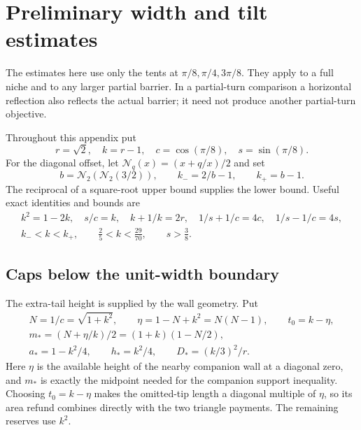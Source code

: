 \section{Preliminary width and tilt estimates}\label{app:preliminary-estimates}

The estimates here use only the tents at $\pi/8,\pi/4,3\pi/8$.
They apply to a full niche and to any larger partial barrier. In a
partial-turn comparison a horizontal reflection also reflects the
actual barrier; it need not produce another partial-turn objective.

Throughout this appendix put
\[
 r=\sqrt2,\quad k=r-1,\quad c=\cos(\pi/8),\quad s=\sin(\pi/8).
\]
For the diagonal offset, let $\mathcal N_q(x)=(x+q/x)/2$ and set
\[
 b=\mathcal N_2(\mathcal N_2(3/2)),\qquad k_-=2/b-1,\qquad k_+=b-1.
\]
The reciprocal of a square-root upper bound supplies the lower bound.
Useful exact identities and bounds are
\begin{equation}\label{eq:preliminary-constants}
 \begin{gathered}
 k^2=1-2k,\quad s/c=k,\quad k+1/k=2r,\quad
 1/s+1/c=4c,\quad 1/s-1/c=4s,\\
 k_-<k<k_+,\qquad \frac25<k<\frac{29}{70},\qquad s>\frac38.
 \end{gathered}
\end{equation}

\subsection{Caps below the unit-width boundary}

The extra-tail height is supplied by the wall geometry. Put
\[
 \begin{gathered}
 N=1/c=\sqrt{1+k^2},\qquad \eta=1-N+k^2=N(N-1),\qquad t_0=k-\eta,\\
 m_*=(N+\eta/k)/2=(1+k)(1-N/2),\\
 a_*=1-k^2/4,\qquad h_*=k^2/4,\qquad D_*=(k/3)^2/r.
 \end{gathered}
\]
Here $\eta$ is the available height of the nearby companion wall at
a diagonal zero, and $m_*$ is exactly the midpoint needed for the
companion support inequality. Choosing $t_0=k-\eta$ makes the omitted-tip
length a diagonal multiple of $\eta$, so its area refund combines directly
with the two triangle payments. The remaining reserves use $k^2$.

